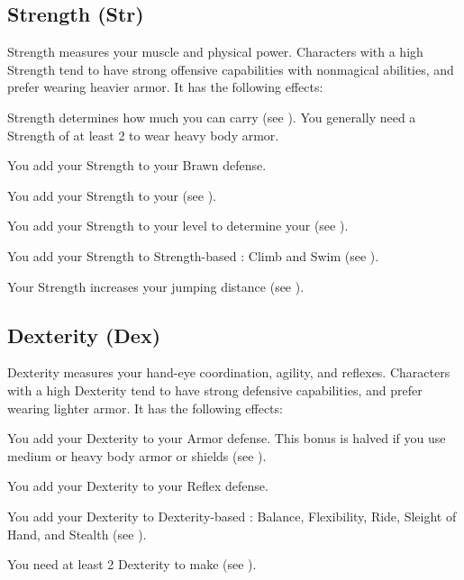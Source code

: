   \subsection{Strength (Str)}\label{Strength}
    {
      Strength measures your muscle and physical power.
      Characters with a high Strength tend to have strong offensive capabilities with nonmagical abilities, and prefer wearing heavier armor.
      It has the following effects:
      \begin{raggeditemize}
        \item Strength determines how much you can carry (see ).
          You generally need a Strength of at least 2 to wear heavy body armor.
        \item You add your Strength to your Brawn defense.
        \item You add your Strength to your  (see ).
        \item You add your Strength to your level to determine your  (see ).
        \item You add your Strength to Strength-based : Climb and Swim (see ).
        \item Your Strength increases your jumping distance (see ).
      \end{raggeditemize}
    }

  \subsection{Dexterity (Dex)}\label{Dexterity}
    {
      Dexterity measures your hand-eye coordination, agility, and reflexes.
      Characters with a high Dexterity tend to have strong defensive capabilities, and prefer wearing lighter armor.
      It has the following effects:
      \begin{raggeditemize}
        \item You add your Dexterity to your Armor defense.
          This bonus is halved if you use medium or heavy body armor or shields (see ).
        \item You add your Dexterity to your Reflex defense.
        \item You add your Dexterity to Dexterity-based : Balance, Flexibility, Ride, Sleight of Hand, and Stealth (see ).
        \item You need at least 2 Dexterity to make  (see ).
      \end{raggeditemize}
    }

